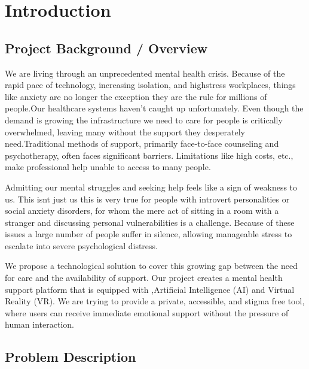 \chapter{Introduction}
\label{chap:introduction}

\section{Project Background / Overview}

We are living through an unprecedented mental health crisis. Because of the rapid pace of technology, increasing isolation, and highstress workplaces, things like anxiety are no longer the exception they are the rule for millions of people.Our healthcare systems haven't caught up unfortunately. Even though the demand is growing  the infrastructure we need to care for people is critically overwhelmed, leaving many without the support they desperately need.Traditional methods of
support, primarily face-to-face counseling and psychotherapy, often faces significant barriers.
Limitations like high costs, etc., make professional help unable to access to many
people.

Admitting our mental struggles and seeking help feels like a sign of weakness to us. This isnt just us this is very true for people with introvert personalities or social anxiety disorders, for whom
the mere act of sitting in a room with a stranger and discussing personal vulnerabilities is a
challenge. Because of these issues a large number of people suffer in silence, allowing manageable
stress to escalate into severe psychological distress.

We propose a technological solution to cover this growing gap between the need for care and the availability of support. Our project creates a mental health support platform that is equipped
with ,Artificial Intelligence (AI) and Virtual
Reality (VR). We are trying to provide a
private, accessible, and stigma free tool, where users can receive immediate emotional support
without the pressure of human interaction.

\newpage

\section{Problem Description}

